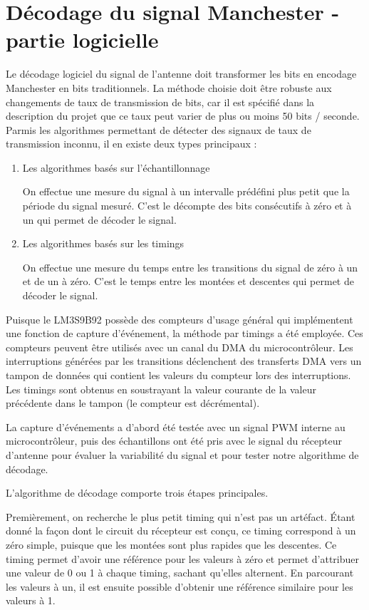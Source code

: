\section{Décodage du signal Manchester - partie logicielle}

Le décodage logiciel du signal de l'antenne doit transformer les bits en encodage Manchester en bits traditionnels. La méthode choisie doit être robuste aux changements de taux de transmission de bits, car il est spécifié dans la description du projet que ce taux peut varier de plus ou moins 50 bits / seconde. Parmis les algorithmes permettant de détecter des signaux de taux de transmission inconnu, il en existe deux types principaux : 

\begin{enumerate}
\item{Les algorithmes basés sur l'échantillonnage}

On effectue une mesure du signal à un intervalle prédéfini plus petit que la période du signal mesuré. C'est le décompte des bits consécutifs à zéro et à un qui permet de décoder le signal.

\item{Les algorithmes basés sur les timings} 

On effectue une mesure du temps entre les transitions du signal de zéro à un et de un à zéro. C'est le temps entre les montées et descentes qui permet de décoder le signal.
\end{enumerate}

Puisque le LM3S9B92 possède des compteurs d'usage général qui implémentent une fonction de capture d'événement, la méthode par timings a été employée. Ces compteurs peuvent être utilisés avec un canal du DMA du microcontrôleur. Les interruptions générées par les transitions déclenchent des transferts DMA vers un tampon de données qui contient les valeurs du compteur lors des interruptions. Les timings sont obtenus en soustrayant la valeur courante de la valeur précédente dans le tampon (le compteur est décrémental). 

La capture d'événements a d'abord été testée avec un signal PWM interne au microcontrôleur, puis des échantillons ont été pris avec le signal du récepteur d'antenne pour évaluer la variabilité du signal et pour tester notre algorithme de décodage. 

L'algorithme de décodage comporte trois étapes principales. 

Premièrement, on recherche le plus petit timing qui n'est pas un artéfact. Étant donné la façon dont le circuit du récepteur est conçu, ce timing correspond à un zéro simple, puisque que les montées sont plus rapides que les descentes. Ce timing permet d'avoir une référence pour les valeurs à zéro et permet d'attribuer une valeur de 0 ou 1 à chaque timing, sachant qu'elles alternent. En parcourant les valeurs à un, il est ensuite possible d'obtenir une référence similaire pour les valeurs à 1.

